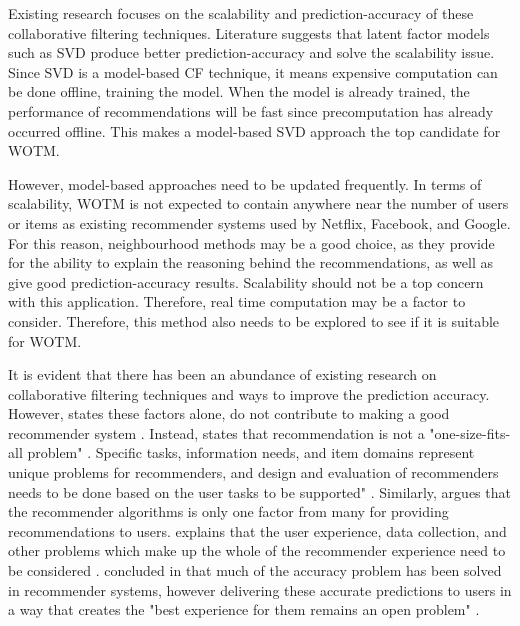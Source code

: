 Existing research focuses on the scalability and prediction-accuracy of these collaborative filtering techniques. Literature suggests that latent factor models such as SVD produce better prediction-accuracy and solve the scalability issue. Since SVD is a model-based CF technique, it means expensive computation can be done offline, training the model. When the model is already trained, the performance of recommendations will be fast since precomputation has already occurred offline. This makes a model-based SVD approach the top candidate for WOTM. 

However, model-based approaches need to be updated frequently. In terms of scalability, WOTM is not expected to contain anywhere near the number of users or items as existing recommender systems used by Netflix, Facebook, and Google. For this reason, neighbourhood methods may be a good choice, as they provide for the ability to explain the reasoning behind the recommendations, as well as give good prediction-accuracy results. Scalability should not be a top concern with this application. Therefore, real time computation may be a factor to consider. Therefore, this method also needs to be explored to see if it is suitable for WOTM.

It is evident that there has been an abundance of existing research on collaborative filtering techniques and ways to improve the prediction accuracy. However, \citeauthor{schafer2007collaborative} states these factors alone, do not contribute to making a good recommender system \cite{schafer2007collaborative}. Instead, \citeauthor{schafer2007collaborative} states that recommendation is not a "one-size-fits-all problem"  \cite{schafer2007collaborative}. Specific tasks, information needs, and item domains represent unique problems for recommenders, and design and evaluation of recommenders needs to be done based on the user tasks to be supported" \cite{schafer2007collaborative}. Similarly, \citeauthor{martin2009recsys} argues that the recommender algorithms is only one factor from many for providing recommendations to users. \citeauthor{martin2009recsys} explains that the user experience, data collection, and other problems which make up the whole of the recommender experience need to be considered \cite{schafer2007collaborative, martin2009recsys}. \citeauthor{interface} concluded in \cite{interface} that much of the accuracy problem has been solved in recommender systems, however delivering these accurate predictions to users in a way that creates the "best experience for them remains an open problem" \cite{interface}. 

